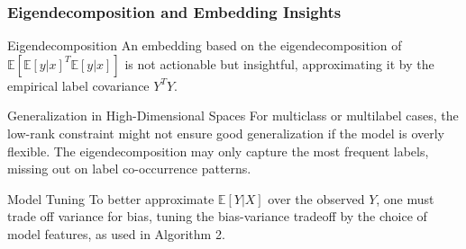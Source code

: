 \documentclass{beamer}
\begin{document}
\begin{frame}
\frametitle{Eigendecomposition and Embedding Insights}
\begin{block}{Eigendecomposition}
An embedding based on the eigendecomposition of \( \mathbb{E}[\mathbb{E}[y|x]^T \mathbb{E}[y|x]] \) is not actionable but insightful, approximating it by the empirical label covariance \( Y^TY \).
\end{block}
\begin{block}{Generalization in High-Dimensional Spaces}
For multiclass or multilabel cases, the low-rank constraint might not ensure good generalization if the model is overly flexible. The eigendecomposition may only capture the most frequent labels, missing out on label co-occurrence patterns.
\end{block}
\begin{block}{Model Tuning}
To better approximate \( \mathbb{E}[Y|X] \) over the observed \( Y \), one must trade off variance for bias, tuning the bias-variance tradeoff by the choice of model features, as used in Algorithm 2.
\end{block}
\end{frame}


\end{document}
